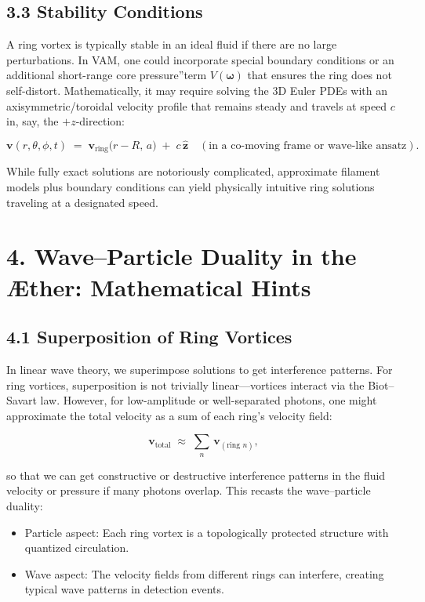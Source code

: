 \documentclass[a4paper,12pt]{article}
\begin{document}
\subsection*{3.3 Stability Conditions}
A ring vortex is typically stable in an ideal fluid if there are no large perturbations. In VAM, one could incorporate special boundary conditions or an additional short-range \grqq core pressure\textquotedblright term \(V(\boldsymbol{\omega})\) that ensures the ring does not self-distort. Mathematically, it may require solving the 3D Euler PDEs with an axisymmetric/toroidal velocity profile that remains steady and travels at speed \(c\) in, say, the \(+z\)-direction:

\[
 \mathbf{v}(r,\theta,\phi, t) \;=\; \mathbf{v}_\text{ring}\bigl(r - R,\,a\bigr) \;+\; c\,\hat{\mathbf{z}} \quad (\text{in a co-moving frame or wave-like ansatz}).
\]

While fully exact solutions are notoriously complicated, approximate filament models plus boundary conditions can yield physically intuitive ring solutions traveling at a designated speed.

\section*{4. Wave–Particle Duality in the Æther: Mathematical Hints}
\subsection*{4.1 Superposition of Ring Vortices}
In linear wave theory, we superimpose solutions to get interference patterns. For ring vortices, superposition is not trivially linear—vortices interact via the Biot–Savart law. However, for low-amplitude or well-separated photons, one might approximate the total velocity as a sum of each ring's velocity field:

\[
 \mathbf{v}_\text{total} \;\approx\; \sum_{n}\,\mathbf{v}_{(\text{ring } n)},
\]

so that we can get constructive or destructive interference patterns in the fluid velocity or pressure if many photons overlap. This recasts the wave–particle duality:

\begin{itemize}
 \item Particle aspect: Each ring vortex is a topologically protected structure with quantized circulation.
 \item Wave aspect: The velocity fields from different rings can interfere, creating typical wave patterns in detection events.
\end{itemize}
\end{document}
